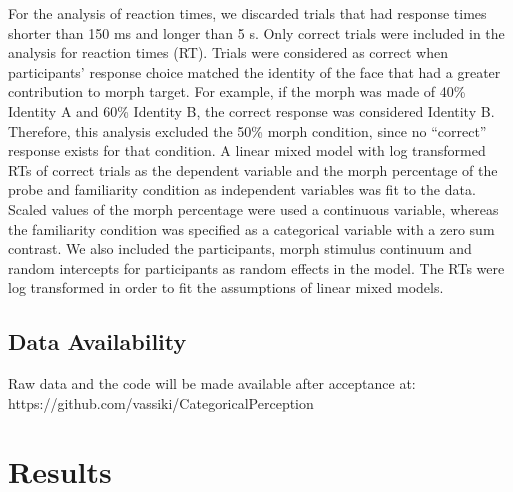 \documentclass[10pt,letterpaper]{article}
\begin{document}
For the analysis of reaction times, we discarded trials that had response times shorter than 150 ms and longer than 5 s. Only correct trials were included in the analysis for reaction times (RT). Trials were considered as correct when participants’ response choice matched the identity of the face that had a greater contribution to morph target. For example, if the morph was made of 40\% Identity A and 60\% Identity B, the correct response was considered Identity B. Therefore, this analysis excluded the 50\% morph condition, since no “correct” response exists for that condition. A linear mixed model with log transformed RTs of correct trials as the dependent variable and the morph percentage of the probe and familiarity condition as independent variables was fit to the data. Scaled values of the morph percentage were used a continuous variable, whereas the familiarity condition was specified as a categorical variable with a zero sum contrast. We also included the participants, morph stimulus continuum and random intercepts for participants as random effects in the model. The RTs were log transformed in order to fit the assumptions of linear mixed models. 

\subsection*{Data Availability}
Raw data and the code will be made available after acceptance at: https://github.com/vassiki/CategoricalPerception

\section*{Results}
\end{document}
